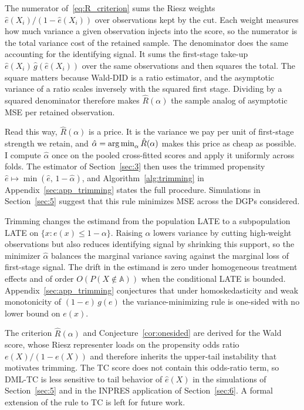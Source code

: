 The numerator of~\eqref{eq:R_criterion} sums the Riesz weights $\hat e(X_i)/(1-\hat e(X_i))$ over observations kept by the cut. Each weight measures how much variance a given observation injects into the score, so the numerator is the total variance cost of the retained sample. The denominator does the same accounting for the identifying signal. It sums the first-stage take-up $\hat e(X_i)\,\hat g(\hat e(X_i))$ over the same observations and then squares the total. The square matters because Wald-DID is a ratio estimator, and the asymptotic variance of a ratio scales inversely with the squared first stage. Dividing by a squared denominator therefore makes $\hat R(\alpha)$ the sample analog of asymptotic MSE per retained observation.

Read this way, $\hat R(\alpha)$ is a price. It is the variance we pay per unit of first-stage strength we retain, and $\hat\alpha = \operatorname*{arg\,min}_\alpha \hat R(\alpha)$ makes this price as cheap as possible. I compute $\hat\alpha$ once on the pooled cross-fitted scores and apply it uniformly across folds. The estimator of Section~\ref{sec:3} then uses the trimmed propensity $\hat e \mapsto \min(\hat e,\,1-\hat\alpha)$, and Algorithm~\ref{alg:trimming} in Appendix~\ref{sec:app_trimming} states the full procedure. Simulations in Section~\ref{sec:5} suggest that this rule minimizes MSE across the DGPs considered.

\begin{remark}\label{rmk:bias_variance}
Trimming changes the estimand from the population LATE to a subpopulation LATE on $\{x : e(x)\le 1-\alpha\}$. Raising $\alpha$ lowers variance by cutting high-weight observations but also reduces identifying signal by shrinking this support, so the minimizer $\hat\alpha$ balances the marginal variance saving against the marginal loss of first-stage signal. The drift in the estimand is zero under homogeneous treatment effects and of order $O(P(X\notin\mathbb A))$ when the conditional LATE is bounded. Appendix~\ref{sec:app_trimming} conjectures that under homoskedasticity and weak monotonicity of $(1-e)\,g(e)$ the variance-minimizing rule is one-sided with no lower bound on $e(x)$.
\end{remark}

\begin{remark}\label{rmk:trim_scope}
The criterion $\hat R(\alpha)$ and Conjecture~\ref{cor:onesided} are derived for the Wald score, whose Riesz representer loads on the propensity odds ratio $e(X)/(1-e(X))$ and therefore inherits the upper-tail instability that motivates trimming. The TC score does not contain this odds-ratio term, so DML-TC is less sensitive to tail behavior of $\hat e(X)$ in the simulations of Section~\ref{sec:5} and in the INPRES application of Section~\ref{sec:6}. A formal extension of the rule to TC is left for future work.
\end{remark}
